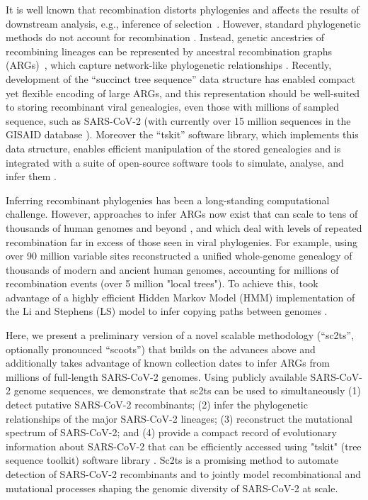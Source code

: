\documentclass{article}
\begin{document}
It is well known that recombination distorts phylogenies \citep{Schierup2000-fg}
and affects the results of downstream analysis, e.g., inference of
selection~\citep{Anisimova2003-vr}. However, standard phylogenetic methods do
not account for recombination
\citep[e.g.][]{Ronquist2012-zw,Minh2020-lr,Guindon2003-zd}. Instead,
genetic ancestries of recombining lineages can be represented by ancestral
recombination graphs (ARGs)~\citep{Griffiths1981-lw,Hudson1983-properties}, which
capture network-like phylogenetic relationships \citep{Gusfield2014-qw}. Recently,
development of the ``succinct tree sequence'' data
structure \citep{Kelleher2018-xc}  has enabled compact yet flexible
encoding of large ARGs, and this representation should be well-suited to storing
recombinant viral genealogies, even those with millions of sampled sequence,
such as SARS-CoV-2 (with currently over 15 million sequences in the GISAID database
\citep{Shu2017-hp}). Moreover the ``tskit'' software library, which implements this
data structure, enables efficient manipulation of the stored genealogies and is
integrated with a suite of open-source software tools to simulate, analyse, and
infer them \citep{Baumdicker2022-ep,Kelleher2018-xc,Kelleher2019-ba,Wohns2022-th}.


Inferring recombinant phylogenies has been a long-standing computational challenge.
However, approaches to infer ARGs now exist that can scale to tens of
thousands of human genomes and beyond
\citep{Speidel2019-yh,Kelleher2019-ba,Zhang2021-lf,Schaefer2021-yg}, and which
deal with levels of repeated recombination far in excess of those seen in viral
phylogenies. For example, using over 90 million variable sites
\citet{Wohns2022-th} reconstructed a unified whole-genome genealogy of thousands
of modern and ancient human genomes, accounting for millions of recombination
events (over 5 million "local trees"). To achieve this, \cite{Wohns2022-th}
took advantage of a highly efficient Hidden Markov Model (HMM) implementation
of the Li and Stephens (LS) model \citep{Li2003-ib} to infer copying paths between
genomes \citep{Kelleher2019-ba}.


Here, we present a preliminary version of a novel scalable methodology
(``sc2ts'', optionally pronounced ``scoots'') that builds on the advances above
and additionally takes advantage of known collection dates to infer ARGs from millions
of full-length SARS-CoV-2 genomes. Using publicly available SARS-CoV-2 genome sequences,
we demonstrate that sc2ts can be used to simultaneously (1) detect putative SARS-CoV-2
recombinants; (2) infer the phylogenetic relationships of the major SARS-CoV-2 lineages;
(3) reconstruct the mutational spectrum of SARS-CoV-2; and (4) provide a compact record
of evolutionary information about SARS-CoV-2 that can be efficiently accessed using
"tskit" (tree sequence toolkit) software library \citep{Kelleher2018-xc}.
Sc2ts is a promising method to automate detection of SARS-CoV-2 recombinants
and to jointly model recombinational and mutational processes shaping the genomic
diversity of SARS-CoV-2 at scale.
\end{document}
